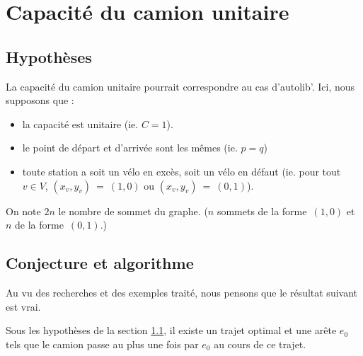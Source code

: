 \chapter{Capacité du camion unitaire}
\label{Capacite unitaire}

\section{Hypothèses}
\label{Capacité unitaire - hypothèse}

La capacité du camion unitaire pourrait correspondre au cas d'autolib'. Ici, nous supposons que :
\begin{itemize}
\item la capacité est unitaire (ie. $C=1$).
\item le point de départ et d'arrivée sont les mêmes (ie. $p=q$)
\item toute station a soit un vélo en excès, soit un vélo en défaut (ie. pour tout $v \in V$, $(x_v,y_v)~=~(1,0)$ ou $(x_v,y_v)~=~(0,1)$).
\end{itemize}
On note $2n$ le nombre de sommet du graphe. ($n$ sommets de la forme~$(1,0)$ et $n$ de la forme~$(0,1)$.)

\section{Conjecture et algorithme}
\label{capacité unitaire - conjecture et algorithme}

Au vu des recherches et des exemples traité, nous pensons que le résultat suivant est vrai.

\begin{conj} \label{conj: capacité unitaire - un passage}
Sous les hypothèses de la section \ref{Capacité unitaire - hypothèse}, il existe un trajet optimal et une arête $e_0$ tels que le camion passe au plus une fois par $e_0$ au cours de ce trajet.
\end{conj}

